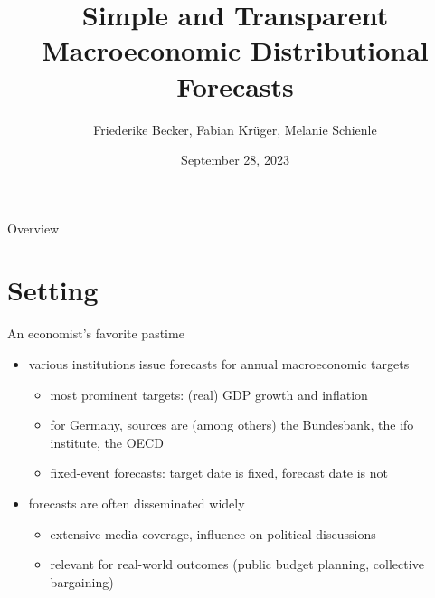 \documentclass[en]{sdqbeamer}
\title[Simple Prediction Intervals]{Simple and Transparent Macroeconomic Distributional Forecasts}
\subtitle{}
\author[Friederike Becker, Fabian Krüger, Melanie Schienle]{Friederike Becker, Fabian Krüger, Melanie Schienle}
\date[28.\,9.\,2023]{September 28, 2023}
\begin{document}
 
\KITtitleframe

\begin{frame}{Overview}
\tableofcontents
\end{frame}

\section{Setting}


\begin{frame}{An economist's favorite pastime}
	\begin{itemize}
	    \item various institutions issue forecasts for annual macroeconomic targets
     \begin{itemize}
        \item most prominent targets: (real) GDP growth and inflation
        \item for Germany, sources are (among others) the Bundesbank, the ifo institute, the OECD
         \item fixed-event forecasts: target date is fixed, forecast date is not
     \end{itemize}
     \item forecasts are often disseminated widely
     \begin{itemize}
         \item extensive media coverage, influence on political discussions
         \item relevant for real-world outcomes (public budget planning, collective bargaining)
     \end{itemize}
	\end{itemize}
\end{frame}
\end{document}
